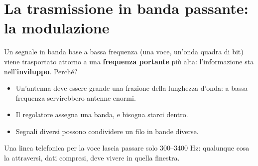 \section{La trasmissione in banda passante: la modulazione}

Un segnale in banda base a bassa frequenza (una voce, un'onda quadra di bit) viene trasportato attorno a una \textbf{frequenza
portante} più alta: l'informazione sta nell'\textbf{inviluppo}. Perché?

\begin{itemize}
    \item Un'antenna deve essere grande una frazione della lunghezza d'onda: a bassa frequenza servirebbero antenne enormi.
    \item Il regolatore assegna una banda, e bisogna starci dentro.
    \item Segnali diversi possono condividere un filo in bande diverse.
\end{itemize}

Una linea telefonica per la voce lascia passare solo 300--3400 Hz: qualunque cosa la attraversi, dati compresi, deve vivere in
quella finestra.

